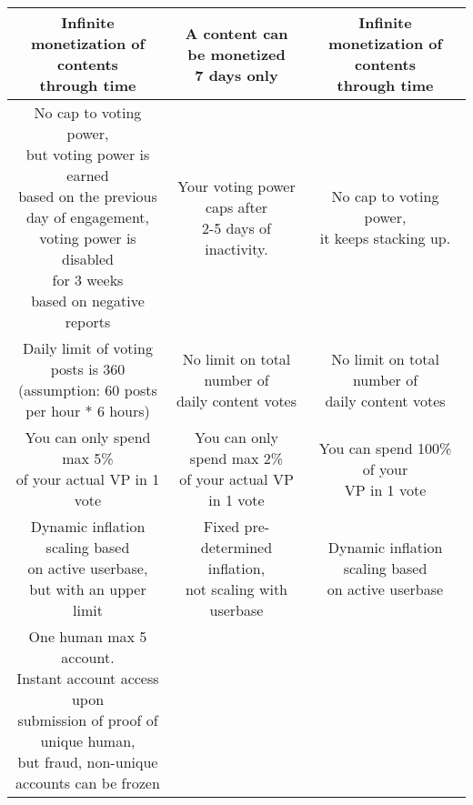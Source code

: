 \documentclass[a4paper]{article}
\begin{document}
\begin{center}
\begin{tabular}{|c|c|c|}
    \makecell{Infinite monetization of contents\\ through time} 
    &
    \makecell{A content can be monetized\\ 7 days only} 
    & 
    \makecell{Infinite monetization of contents\\ through time} \\ \hline
    \makecell{No cap to voting power,\\ but voting power is earned\\ based on the previous\\ day of engagement, \\ voting power is disabled\\ for 3 weeks \\based on negative reports} 
    &
    \makecell{Your voting power caps after\\ 2-5 days of inactivity.} 
    & 
    \makecell{No cap to voting power,\\ it keeps stacking up.}\\ \hline
    \makecell{Daily limit of voting posts is 360\\ (assumption: 60 posts\\ per hour * 6 hours)} 
    &
    \makecell{No limit on total number of\\ daily content votes} 
    & 
    \makecell{No limit on total number of\\ daily content votes}\\ \hline
    \makecell{You can only spend max 5\% \\ of your actual VP in 1 vote} 
    &
    \makecell{You can only spend max 2\% \\ of your actual VP in 1 vote} 
    & 
    \makecell{You can spend 100\% of your \\VP in 1 vote}\\ \hline
    \makecell{Dynamic inflation scaling based\\ on active userbase,\\ but with an upper limit} 
    &
    \makecell{Fixed pre-determined inflation,\\ not scaling with userbase} 
    & 
    \makecell{Dynamic inflation scaling based\\ on active userbase}\\ \hline
    \makecell{One human max 5 account. \\Instant account access upon\\ submission of proof of\\ unique human,\\ but fraud, non-unique\\ accounts can be frozen} 

\end{tabular}
\end{center}
\end{document}
